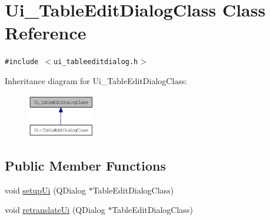 \hypertarget{class_ui___table_edit_dialog_class}{
\section{Ui\_\-TableEditDialogClass Class Reference}
\label{class_ui___table_edit_dialog_class}
}
{\tt \#include $<$ui\_\-tableeditdialog.h$>$}

Inheritance diagram for Ui\_\-TableEditDialogClass:\nopagebreak
\begin{figure}[H]
\begin{center}
\leavevmode
\includegraphics[width=83pt]{class_ui___table_edit_dialog_class__inherit__graph}
\end{center}
\end{figure}
\subsection*{Public Member Functions}
\begin{CompactItemize}
\item 
void \hyperlink{class_ui___table_edit_dialog_class_a2daa38830f3a3d673e96af45346c219}{setupUi} (QDialog $\ast$TableEditDialogClass)
\item 
void \hyperlink{class_ui___table_edit_dialog_class_547c3697e729090904ba22df709f2e38}{retranslateUi} (QDialog $\ast$TableEditDialogClass)
\end{CompactItemize}
